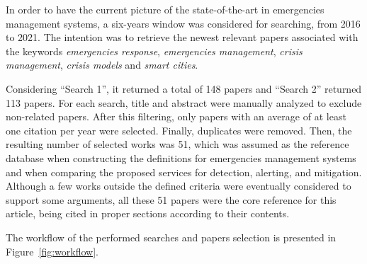 \begin{refsection}
In order to have the current picture of the state-of-the-art in emergencies management systems, a six-years window was considered for searching, from 2016 to 2021. The intention was to retrieve the newest relevant papers associated with the keywords \textit{emergencies response}, \textit{emergencies management}, \textit{crisis management}, \textit{crisis models} and \textit{smart cities}.

Considering ``Search 1'', it returned a total of 148 papers and ``Search 2'' returned 113 papers. For each search, title and abstract were manually analyzed to exclude non-related papers. After this filtering, only papers with an average of at least one citation per year were selected. Finally, duplicates were removed. Then, the resulting number of selected works was 51, which was assumed as the reference database when constructing the definitions for emergencies management systems and when comparing the proposed services for detection, alerting, and mitigation. Although a few works outside the defined criteria were eventually considered to support some arguments, all these 51 papers were the core reference for this article, being cited in proper sections according to their contents.

The workflow of the performed searches and papers selection is presented in Figure~\ref{fig:workflow}.


\end{refsection}
